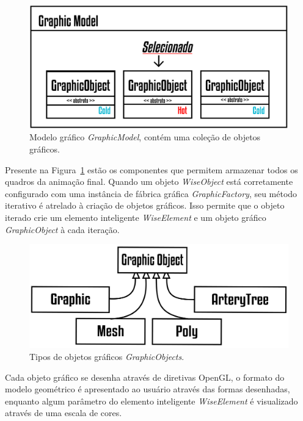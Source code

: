 \documentclass[a4paper,12pt]{monografia}
\theoremstyle{plain}
\theoremstyle{definition}
\theoremstyle{remark}
\begin{document}
\begin{figure}[!htbp]
	\centering
	\includegraphics[scale=2]{Figures/GraphicModel@16x.png}
	\caption{Modelo gráfico \textit{GraphicModel}, contém uma coleção de objetos gráficos.}
	\label{fig7:graphicmodel}
\end{figure}

Presente na Figura~\ref{fig7:graphicmodel} estão os componentes que permitem armazenar todos os quadros da animação final. Quando um objeto \textit{WiseObject} está corretamente configurado com uma instância de fábrica gráfica \textit{GraphicFactory}, seu método iterativo é atrelado à criação de objetos gráficos. Isso permite que o objeto iterado crie um elemento inteligente \textit{WiseElement} e um objeto gráfico \textit{GraphicObject} à cada iteração.

\begin{figure}[!htbp]
	\centering
	\includegraphics[scale=2]{Figures/GraphicObjects@16x.png}
	\caption{Tipos de objetos gráficos \textit{GraphicObjects}.}
	\label{fig7:graphicobjects}
\end{figure}

Cada objeto gráfico se desenha através de diretivas OpenGL, o formato do modelo geométrico é apresentado ao usuário através das formas desenhadas, enquanto algum parâmetro do elemento inteligente \textit{WiseElement} é visualizado através de uma escala de cores.
\end{document}
